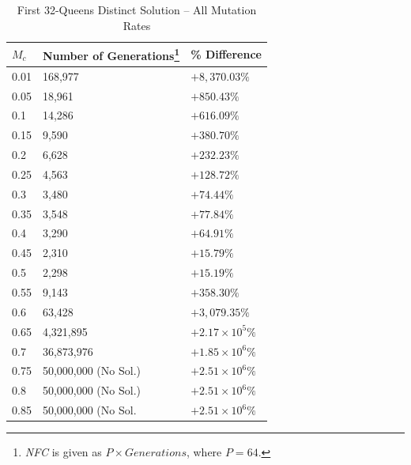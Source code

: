 \documentclass[conference]{IEEEtran}
\begin{document}
\begin{table}
\caption{First 32-Queens Distinct Solution -- All Mutation Rates}
\begin{minipage}{\columnwidth}%
\centering
\renewcommand\footnoterule{ \kern -2ex}
\renewcommand{\thempfootnote}{\fnsymbol{mpfootnote}}
{\renewcommand{\arraystretch}{1.2}
\begin{tabular}{|l|l|l|} \hline
$M_{c}$&         Number of Generations\footnote{\emph{NFC} is given as $P \times Generations$, where $P = 64$.}&                        \% Difference \\ \hline
0.01&            168,977&                    $ +8,370.03\% $ \\ \hline
0.05&            18,961&                     $ +850.43\% $ \\ \hline
0.1&             14,286&                     $ +616.09\% $ \\ \hline
0.15&            9,590&                      $ +380.70\% $ \\ \hline
0.2&             6,628&                      $ +232.23\% $ \\ \hline
0.25&            4,563&                      $ +128.72\% $ \\ \hline
0.3&             3,480&                      $ +74.44\% $ \\ \hline
0.35&            3,548&                      $ +77.84\% $ \\ \hline
0.4&             3,290&                      $ +64.91\% $ \\ \hline
0.45&            2,310&                      $ +15.79\% $ \\ \hline
0.5&             2,298&                      $ +15.19\% $ \\ \hline
0.55&            9,143&                      $ +358.30\% $ \\ \hline
0.6&             63,428&                     $ +3,079.35\% $ \\ \hline
0.65&            4,321,895&                  $ +2.17\times10^{5}\% $ \\ \hline
0.7&             36,873,976&                 $ +1.85\times10^{6}\% $ \\ \hline
0.75&            50,000,000 (No Sol.)&       $ +2.51\times10^{6}\% $ \\ \hline
0.8&             50,000,000 (No Sol.)&       $ +2.51\times10^{6}\% $ \\ \hline
0.85&            50,000,000 (No Sol.&        $ +2.51\times10^{6}\% $ \\ \hline

\end{tabular}}
\end{minipage}
\end{table}
\end{document}
